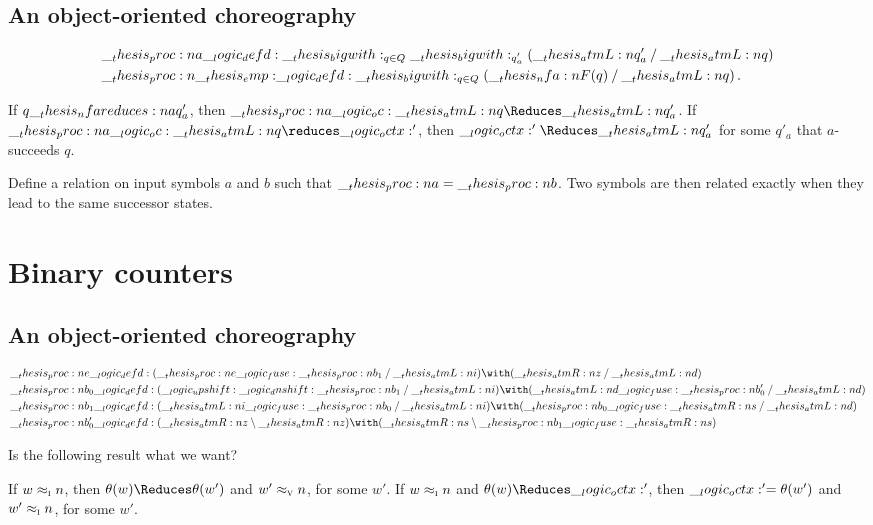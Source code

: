 \subsection{An object-oriented choreography}

\begin{equation*}
  \begin{lgathered}
    \proc{a} \defd \bigwith_{q \in Q} \bigwith_{q\smash{'_a}} (\atmL{q}'_a \pmir \atmL{q}) \\
    \proc{\emp} \defd \bigwith_{q \in Q} (\nfa{F}(q) \pmir \atmL{q})
    \,.
  \end{lgathered}
\end{equation*}

\begin{corollary}
  If $q \nfareduces[a] q'_a$, then $\proc{a} \oc \atmL{q} \Reduces \atmL{q}'_a$.
  If $\proc{a} \oc \atmL{q} \reduces \octx'$, then $\octx' \Reduces \atmL{q}'_a$ for some $q'_a$ that $a$-succeeds $q$.
\end{corollary}

Define a relation on input symbols $a$ and $b$ such that $\__thesis_proc:n {a} = \__thesis_proc:n {b}$.
Two symbols are then related exactly when they lead to the same successor states.

\section{Binary counters}

\subsection{An object-oriented choreography}

\begin{equation*}
  \begin{lgathered}
    \proc{e} \defd (\proc{e} \fuse \proc{b}_1 \pmir \atmL{i}) \with (\atmR{z} \pmir \atmL{d}) \\
    \proc{b}_0 \defd (\up \dn \proc{b}_1 \pmir \atmL{i}) \with (\atmL{d} \fuse \proc{b}'_0 \pmir \atmL{d}) \\
    \proc{b}_1 \defd (\atmL{i} \fuse \proc{b}_0 \pmir \atmL{i}) \with (\proc{b}_0 \fuse \atmR{s} \pmir \atmL{d}) \\
    \proc{b}'_0 \defd (\atmR{z} \limp \atmR{z}) \with (\atmR{s} \limp \proc{b}_1 \fuse \atmR{s})
  \end{lgathered}
\end{equation*}


Is the following result what we want?
\begin{corollary}
  If $w \approx\sb{\text{\normalfont\scshape i}} n$, then $\theta(w) \Reduces \theta(w')$ and $w' \approx\sb{\text{\normalfont\scshape v}} n$, for some $w'$.
  If $w \approx\sb{\text{\normalfont\scshape i}} n$ and $\theta(w) \Reduces \octx'$, then $\__logic_octx:' = \theta(w')$ and $w' \approx\sb{\text{\normalfont\scshape i}} n$, for some $w'$.
\end{corollary}



